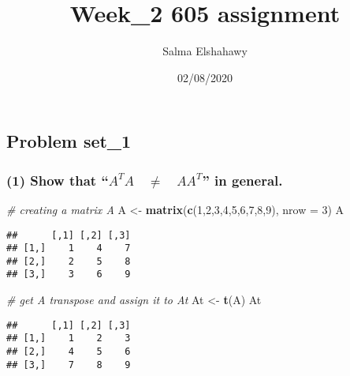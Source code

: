 \documentclass[]{article}
\title{Week\_2 605 assignment}
\author{Salma Elshahawy}
\date{02/08/2020}
\newenvironment{Shaded}{\begin{snugshade}}{\end{snugshade}}
\newcommand{\CommentTok}[1]{\textcolor[rgb]{0.56,0.35,0.01}{\textit{#1}}}
\newcommand{\DataTypeTok}[1]{\textcolor[rgb]{0.13,0.29,0.53}{#1}}
\newcommand{\DecValTok}[1]{\textcolor[rgb]{0.00,0.00,0.81}{#1}}
\newcommand{\KeywordTok}[1]{\textcolor[rgb]{0.13,0.29,0.53}{\textbf{#1}}}
\newcommand{\NormalTok}[1]{#1}
\newcommand{\StringTok}[1]{\textcolor[rgb]{0.31,0.60,0.02}{#1}}
\begin{document}
\maketitle

\hypertarget{problem-set_1}{%
\subsection{Problem set\_1}\label{problem-set_1}}

\hypertarget{show-that-a-t-aquad-neq-quad-a-a-t-in-general.}{%
\subsubsection{\texorpdfstring{(1) Show that
``\({ A }^{ T }A\quad \neq \quad A{ A }^{ T }\)'' in
general.}{(1) Show that ``\{ A \}\^{}\{ T \}A\textbackslash quad \textbackslash neq \textbackslash quad A\{ A \}\^{}\{ T \}'' in general.}}\label{show-that-a-t-aquad-neq-quad-a-a-t-in-general.}}

\begin{Shaded}
\begin{Highlighting}[]
\CommentTok{# creating a matrix A}
\NormalTok{A <-}\StringTok{ }\KeywordTok{matrix}\NormalTok{(}\KeywordTok{c}\NormalTok{(}\DecValTok{1}\NormalTok{,}\DecValTok{2}\NormalTok{,}\DecValTok{3}\NormalTok{,}\DecValTok{4}\NormalTok{,}\DecValTok{5}\NormalTok{,}\DecValTok{6}\NormalTok{,}\DecValTok{7}\NormalTok{,}\DecValTok{8}\NormalTok{,}\DecValTok{9}\NormalTok{), }\DataTypeTok{nrow =} \DecValTok{3}\NormalTok{)}
\NormalTok{A}
\end{Highlighting}
\end{Shaded}

\begin{verbatim}
##      [,1] [,2] [,3]
## [1,]    1    4    7
## [2,]    2    5    8
## [3,]    3    6    9
\end{verbatim}

\begin{Shaded}
\begin{Highlighting}[]
\CommentTok{# get A transpose and assign it to At}
\NormalTok{At <-}\StringTok{ }\KeywordTok{t}\NormalTok{(A)}
\NormalTok{At}
\end{Highlighting}
\end{Shaded}

\begin{verbatim}
##      [,1] [,2] [,3]
## [1,]    1    2    3
## [2,]    4    5    6
## [3,]    7    8    9
\end{verbatim}
\end{document}
